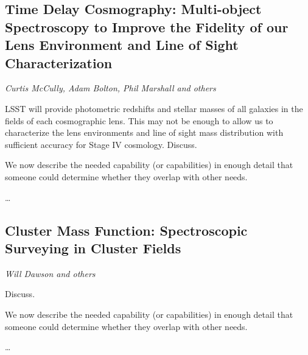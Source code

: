 
\subsection{Time Delay Cosmography: Multi-object Spectroscopy to Improve the Fidelity of our Lens Environment and Line of Sight Characterization}
{\it Curtis McCully, Adam Bolton, Phil Marshall and others}

LSST will provide photometric redshifts and stellar masses of all
galaxies in the fields of each cosmographic lens. This may not be enough
to allow us to characterize the lens environments and line of sight mass
distribution with sufficient accuracy for Stage IV cosmology. Discuss.

We now describe the needed capability (or capabilities) in enough detail
that someone could determine whether they overlap with other needs.

\ldots


\subsection{Cluster Mass Function: Spectroscopic Surveying in Cluster Fields}
\label{sec:sl:clusters}
{\it Will Dawson and others}

Discuss.

We now describe the needed capability (or capabilities) in enough detail
that someone could determine whether they overlap with other needs.

\ldots

